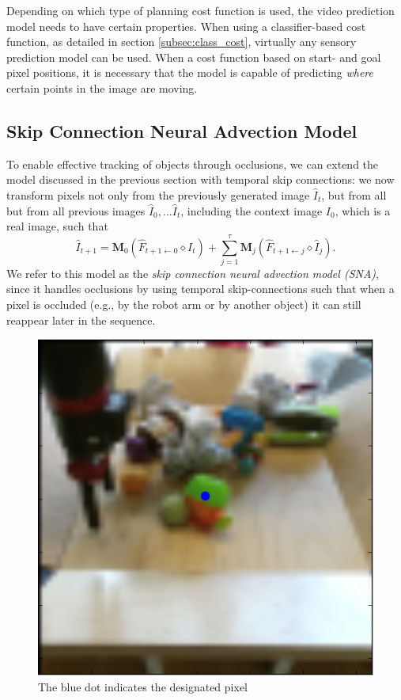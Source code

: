 Depending on which type of planning cost function is used, the video prediction model needs to have certain properties. When using a classifier-based cost function, as detailed in section \ref{subsec:class_cost}, virtually any sensory prediction model can be used. When a cost function based on start- and goal pixel positions, it is necessary that the model is capable of predicting \emph{where} certain points in the image are moving.



\subsection{Skip Connection Neural Advection Model}
\label{subsec:skip}
To enable effective tracking of objects through occlusions, we can extend the model discussed in the previous section with temporal skip connections: we now transform pixels not only from the previously generated image $\hat{I}_t$, but from all but from all previous images $\hat{I}_0,...\hat{I}_{t}$, including the context image $I_0$, which is a real image, such that
\begin{equation}
\hat{I}_{t+1} =  \mathbf{M}_{0} (\hat{F}_{t+1 \leftarrow 0} \diamond I_t) +  \sum_{j=1}^{\tau} \mathbf{M}_{j} (\hat{F}_{t+1 \leftarrow j} \diamond  \hat{I}_j).
\end{equation}
We refer to this model as the \emph{skip connection neural advection model (SNA)}, since it handles occlusions by using temporal skip-connections such that when a pixel is occluded (e.g., by the robot arm or by another object) it can still reappear later in the sequence.
 
 \begin{figure}
 	\centering
 	\includegraphics[width=0.4\columnwidth]{images_sna/occlusionaware/img_desigpixb0.png}
 	\caption{The blue dot indicates the designated pixel}
 	\label{fig:desig_pix_bluedot}
 \end{figure}

